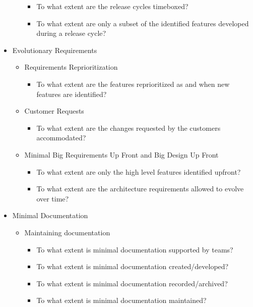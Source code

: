\begin{appendices}
\begin{itemize}
\begin{itemize}
				\begin{itemize}
					\item To what extent are the release cycles timeboxed?
					\item To what extent are only a subset of the identified features developed during a release cycle?
				\end{itemize}
		\end{itemize}
	\item Evolutionary Requirements
		\begin{itemize}
			\item Requirements Reprioritization 
				\begin{itemize}
					\item To what extent are the features reprioritized as and when new features are identified?
				\end{itemize}
			\item Customer Requests
				\begin{itemize}
					\item To what extent are the changes requested by the customers accommodated?
				\end{itemize}
			\item Minimal Big Requirements Up Front and Big Design Up Front
				\begin{itemize}
					\item To what extent are only the high level features identified upfront?
					\item To what extent are the architecture requirements allowed to evolve over time?
				\end{itemize}
		\end{itemize}
	\item Minimal Documentation
		\begin{itemize}
			\item Maintaining documentation 
				\begin{itemize}
					\item To what extent is minimal documentation supported by teams?
					\item To what extent is minimal documentation created/developed?
					\item To what extent is minimal documentation recorded/archived?
					\item To what extent is minimal documentation maintained?
				\end{itemize}
		\end{itemize}
\end{itemize}



\end{appendices}
